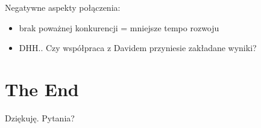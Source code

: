 \documentclass[19pt]{beamer}
\begin{document}
\begin{center}
\begin{frame}
Negatywne aspekty połączenia:
\begin{itemize}
\item brak poważnej konkurencji = mniejsze tempo rozwoju
\item DHH.. Czy współpraca z Davidem przyniesie zakładane wyniki?
\end{itemize}
\end{frame}

\section{The End}

\begin{frame}
Dziękuję. Pytania?
\end{frame}

\end{center}
\end{document}

